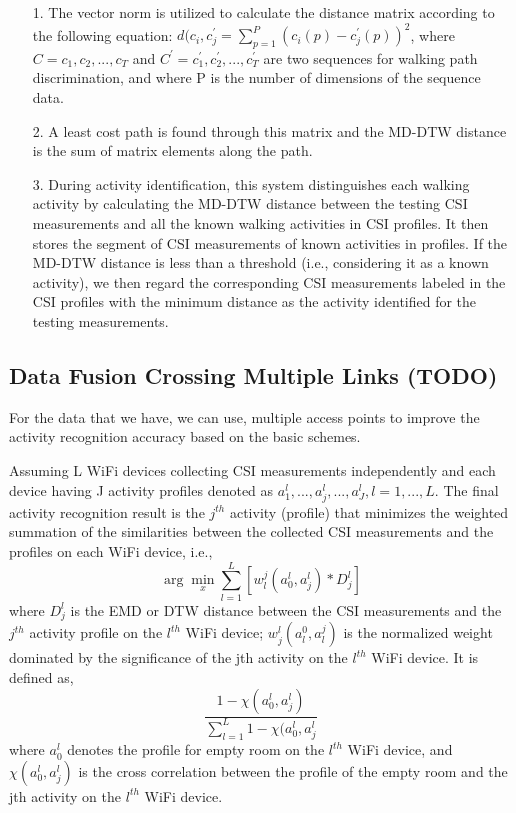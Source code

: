 \documentclass[letterpaper]{article}
\begin{document}
\begin{enumerate}
	\item[1.] The vector norm is utilized to calculate the distance matrix according to the following equation: \(d(c_i,c_j^{'} = \sum_{p=1}^{P} (c_i(p) - c_j^{'}(p))^{2}\), where \(C = c_1, c_2,..., c_T\) and \(C^{'} = c_1^{'}, c_2^{'}, ..., c_T^{'}\) are two sequences for walking path discrimination, and where P is the number of dimensions of the sequence data. 
	\item[2. ] A least cost path is found through this matrix and the MD-DTW distance is the sum of matrix elements along the path.
	\item[3. ] During activity identification, this system distinguishes each walking activity by calculating the MD-DTW distance between the testing CSI measurements and all the known walking activities in CSI profiles. It then stores the segment of CSI measurements of known activities in profiles. If the MD-DTW distance is less than a threshold (i.e., considering it as a known activity), we then regard the corresponding CSI measurements labeled in the CSI profiles with the minimum distance as the activity identified for the testing measurements.
\end{enumerate}

\subsection{Data Fusion Crossing Multiple Links (TODO)}

For the data that we have, we can use, multiple access points to improve the activity recognition accuracy based on the basic schemes. 

Assuming L WiFi devices collecting CSI measurements independently and each device having J activity profiles denoted as \({a_1^{l},...,a_j^{l},...,a_J^{l}}, l = 1,...,L\). The final activity recognition result is the \(j^{th}\) activity (profile) that minimizes the weighted summation of the similarities between the collected CSI measurements and the profiles on each WiFi device, i.e., \[ \arg\!\min_x \sum_{l=1}^{L} [w_l^{j}(a_0^{l}, a_j^{l}) * D_j^{l}]\]
where \(D_j^l\) is the EMD or DTW distance between the CSI measurements and the \(j^{th}\) activity profile on the \(l^{th}\) WiFi device; \(w_j^l (a_l^0 , a_l^j )\) is the normalized weight dominated by the significance of the jth activity on the \(l^{th}\) WiFi device. It is defined as, 
\[
\frac{1-\chi(a_0^l, a_j^l)}
{\sum\limits_{l=1}^{L} 1-\chi(a_0^l, a_j^l}
\]
where \(a_0^l\) denotes the profile for empty room on the \(l^{th}\) WiFi device, and \(\chi (a_0^l, a_j^l)\) is the cross correlation between the profile of the empty room and the jth activity on the \(l^{th}\) WiFi device.
\end{document}
